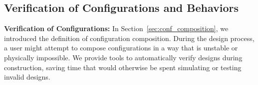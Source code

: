 \documentclass[graybox]{svmult}
\newcommand{\TODO}[1]{ {\bf \textcolor{red}{TODO:} #1 }}
\begin{document}
% 
% 
\subsection{ Verification of Configurations and Behaviors} \label{sec:verify}

{\bf Verification of Configurations: }
In Section~\ref{sec:conf_composition}, we introduced the definition of configuration composition. During the design process, a user might attempt to compose configurations in a way that is unstable or physically impossible. We provide tools to automatically verify designs during construction, saving time that would otherwise be spent simulating or testing invalid designs.
\end{document}
